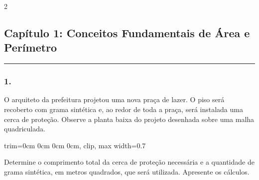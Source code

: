 \documentclass[twoside, 10pt, a4paper]{article}
\newlength{\espacoPosTitulo}\setlength{\espacoPosTitulo}{0.3cm}
\newlength{\espacoQuestao}\setlength{\espacoQuestao}{0.2cm}
\newcommand{\larguraTikz}{0.85\linewidth}
\begin{document}
\par\vspace{0.3cm} 
\raggedcolumns
\begin{multicols*}{2}
\vspace{0.1cm}

\subsection*{Capítulo 1: Conceitos Fundamentais de Área e Perímetro}
\vspace{-0.2cm}\noindent\rule{\linewidth}{1.5pt} 
\par\vspace{\espacoPosTitulo}
\subsubsection*{1.} O arquiteto da prefeitura projetou uma nova praça de lazer. O piso será recoberto com grama sintética e, ao redor de toda a praça, será instalada uma cerca de proteção. Observe a planta baixa do projeto desenhada sobre uma malha quadriculada.

\begin{center}
\begin{adjustbox}{trim=0cm 0cm 0cm 0cm, clip, max width=0.7\linewidth}
\end{adjustbox}
\end{center}

Determine o comprimento total da cerca de proteção necessária e a quantidade de grama sintética, em metros quadrados, que será utilizada. Apresente os cálculos.
\par\vspace{\espacoQuestao}


\end{multicols*}
\end{document}
